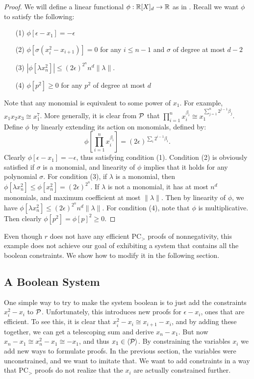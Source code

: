\begin{proof}
We will define a linear functional $\phi: \mathbb R[X]_d \rightarrow \mathbb R$ as in . Recall we want $\phi$ to satisfy the following:
\begin{enumerate}
\item[(1)] $\phi[\epsilon - x_1] = -\epsilon$
\item[(2)] $\phi[\sigma(x_i^2 - x_{i+1})] = 0$ for any $i \leq n-1$ and $\sigma$ of degree at most $d-2$
\item[(3)] $|\phi[\lambda x_n^2]| \leq (2\epsilon)^{2^{n}}n^d\|\lambda\|$.
\item[(4)] $\phi[p^2] \geq 0$ for any $p^2$ of degree at most $d$
\end{enumerate}

Note that any monomial is equivalent to some power of $x_1$. For example, $x_1x_2x_3 \cong x_1^7$.  More generally, it is clear from $\mathcal P$ that $\prod_{i = 1}^n x_i^{\beta_i} \cong x_1^{\sum_{j = 1}^n 2^{j-1} \beta_j}$.  Define $\phi$ by linearly extending its action on monomials, defined by:
\[\phi\left[ \prod_{i = 1}^n x_i^{\beta_i}\right] = (2\epsilon)^{\sum_{i} 2^{i-1} \beta_i }. \]
Clearly $\phi[\epsilon - x_1] = -\epsilon$, thus satisfying condition (1). Condition (2) is obviously satisfied if $\sigma$ is a monomial, and linearity of $\phi$ implies that it holds for any polynomial $\sigma$. For condition (3), if $\lambda$ is a monomial, then $\phi[\lambda x_n^2] \leq \phi[x_n^2] = (2\epsilon)^{2^{n}}$. If $\lambda$ is not a monomial, it has at most $n^d$ monomials, and maximum coefficient at most $\|\lambda\|$. Then by linearity of $\phi$, we have $\phi[\lambda x_n^2] \leq (2\epsilon)^{2^n}n^d\|\lambda\|$. For condition (4), note that $\phi$ is multiplicative. Then clearly $\phi[p^2] = \phi[p]^2 \geq 0$. 
\end{proof}

Even though $r$ does not have any efficient PC$_>$ proofs of nonnegativity, this example does not achieve our goal of exhibiting a system that contains all the boolean constraints. We show how to modify it in the following section.

\subsection{A Boolean System}
One simple way to try to make the system boolean is to just add the constraints $x_i^2 - x_i$ to $\mathcal P$. Unfortunately, this introduces new proofs for $\epsilon - x_i$, ones that are efficient. To see this, it is clear that $x_i^2 - x_i \cong x_{i+1} - x_i$, and by adding these together, we can get a telescoping sum and derive $x_n - x_1$. But now $x_n - x_1 \cong x_n^2 - x_1 \cong -x_1$, and thus $x_1 \in \langle \mathcal P \rangle$. By constraining the variables $x_i$ we add new ways to formulate proofs. In the previous section, the variables were unconstrained, and we want to imitate that. We want to add constraints in a way that PC$_>$ proofs do not realize that the $x_i$ are actually constrained further.

